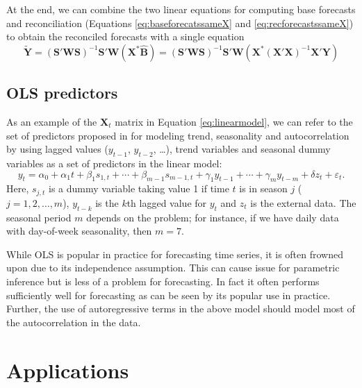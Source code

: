 \documentclass[11pt,a4paper,]{article}
\begin{document}
At the end, we can combine the two linear equations for computing base forecasts and reconciliation (Equations \eqref{eq:baseforecatssameX} and \eqref{eq:recforecastssameX}) to obtain the reconciled forecasts with a single equation
\begin{equation}\label{eq:singlestepsameX}
\tilde{\bm{Y}} = (\bm{S}'\bm{W}\bm{S})^{-1}\bm{S}'\bm{W}
                        (\bm{X}^* \hat{\bm{B}})
                        = (\bm{S}'\bm{W}\bm{S})^{-1}\bm{S}'\bm{W}
                        (\bm{X}^* (\bm{X}'\bm{X})^{-1} \bm{X}'\bm{Y})
\end{equation}

\hypertarget{ols-predictors}{%
\subsection{OLS predictors}\label{ols-predictors}}

As an example of the \(\bm{X}_t\) matrix in Equation \eqref{eq:linearmodel}, we can refer to the set of predictors proposed in \textcite{ashouri2018} for modeling trend, seasonality and autocorrelation by using lagged values (\(y_{t-1}\), \(y_{t-2}\), \dots), trend variables and seasonal dummy variables as a set of predictors in the linear model:
\begin{equation}\label{eq:linearmodelexample}
    y_t = \alpha_0 + \alpha_1 t + \beta_1 s_{1,t} + \cdots + \beta_{m-1} s_{m-1,t} + \gamma_1 y_{t-1} + \cdots + \gamma_m y_{t-m} + \delta z_t + \varepsilon_t.
\end{equation}
Here, \(s_{j,t}\) is a dummy variable taking value 1 if time \(t\) is in season \(j\) (\(j=1, 2, \dots, m\)), \(y_{t-k}\) is the \(k\)th lagged value for \(y_t\) and \(z_t\) is the external data. The seasonal period \(m\) depends on the problem; for instance, if we have daily data with day-of-week seasonality, then \(m=7\).

While OLS is popular in practice for forecasting time series, it is often frowned upon due to its independence assumption. This can cause issue for parametric inference but is less of a problem for forecasting. In fact it often performs sufficiently well for forecasting as can be seen by its popular use in practice. Further, the use of autoregressive terms in the above model should model most of the autocorrelation in the data.

\hypertarget{applications}{%
\section{Applications}\label{applications}}
\end{document}
